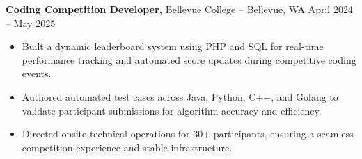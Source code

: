 \documentclass[11pt]{article}       %
\begin{document}

\textbf{Coding Competition Developer,} {Bellevue College} -- Bellevue, WA \hfill April 2024 -- May 2025 \\
\vspace{-9pt}
\begin{itemize}
  \item Built a dynamic leaderboard system using PHP and SQL for real-time performance tracking and automated score updates during competitive coding events.
  \item Authored automated test cases across Java, Python, C++, and Golang to validate participant submissions for algorithm accuracy and efficiency.
  \item Directed onsite technical operations for 30+ participants, ensuring a seamless competition experience and stable infrastructure.
\end{itemize}

\end{document}
